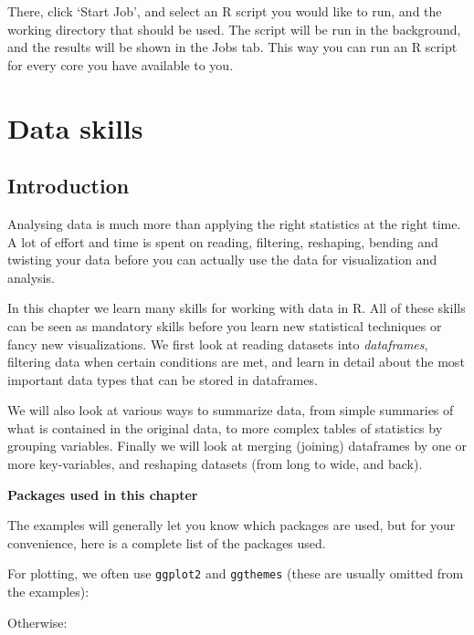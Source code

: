 \documentclass[]{book}
\begin{document}
There, click `Start Job', and select an R script you would like to run, and the working directory that should be used. The script will be run in the background, and the results will be shown in the Jobs tab. This way you can run an R script for every core you have available to you.

\hypertarget{summarize}{%
\chapter{Data skills}\label{summarize}}

\hypertarget{introduction}{%
\section{Introduction}\label{introduction}}

Analysing data is much more than applying the right statistics at the right time. A lot of effort and time is spent on reading, filtering, reshaping, bending and twisting your data before you can actually use the data for visualization and analysis.

In this chapter we learn many skills for working with data in R. All of these skills can be seen as mandatory skills before you learn new statistical techniques or fancy new visualizations. We first look at reading datasets into \emph{dataframes}, filtering data when certain conditions are met, and learn in detail about the most important data types that can be stored in dataframes.

We will also look at various ways to summarize data, from simple summaries of what is contained in the original data, to more complex tables of statistics by grouping variables. Finally we will look at merging (joining) dataframes by one or more key-variables, and reshaping datasets (from long to wide, and back).

\textbf{Packages used in this chapter}

The examples will generally let you know which packages are used, but for your convenience, here is a complete list of the packages used.

For plotting, we often use \texttt{ggplot2} and \texttt{ggthemes} (these are usually omitted from the examples):

Otherwise:
\end{document}
